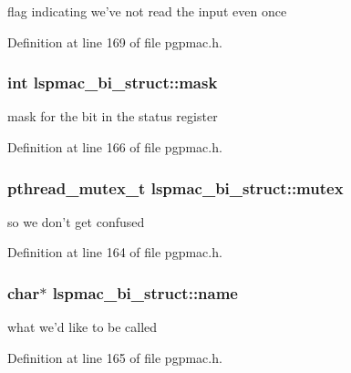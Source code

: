 flag indicating we've not read the input even once 



Definition at line 169 of file pgpmac.\-h.

\hypertarget{structlspmac__bi__struct_ac010058c9883088705059dee1d90ee72}{
\subsubsection[{mask}]{\setlength{\rightskip}{0pt plus 5cm}int lspmac\-\_\-bi\-\_\-struct\-::mask}}\label{structlspmac__bi__struct_ac010058c9883088705059dee1d90ee72}


mask for the bit in the status register 



Definition at line 166 of file pgpmac.\-h.

\hypertarget{structlspmac__bi__struct_a58053a98fa4696b56d674e775b3b4690}{
\subsubsection[{mutex}]{\setlength{\rightskip}{0pt plus 5cm}pthread\-\_\-mutex\-\_\-t lspmac\-\_\-bi\-\_\-struct\-::mutex}}\label{structlspmac__bi__struct_a58053a98fa4696b56d674e775b3b4690}


so we don't get confused 



Definition at line 164 of file pgpmac.\-h.

\hypertarget{structlspmac__bi__struct_a4e614425eaa9d1ff8ba225d264f6dcf6}{
\subsubsection[{name}]{\setlength{\rightskip}{0pt plus 5cm}char$\ast$ lspmac\-\_\-bi\-\_\-struct\-::name}}\label{structlspmac__bi__struct_a4e614425eaa9d1ff8ba225d264f6dcf6}


what we'd like to be called 



Definition at line 165 of file pgpmac.\-h.

